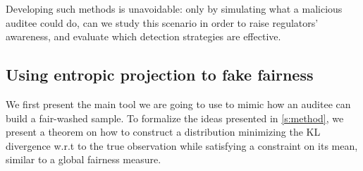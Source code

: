 \documentclass[runningheads, orivec]{llncs}
\begin{document}
Developing such methods is unavoidable: only by simulating what a malicious auditee could do, can we study this scenario in order to raise regulators’ awareness, and evaluate which detection strategies are effective.

\subsection{Using entropic projection to fake fairness} \label{sec:KL}
We first present the main tool we are going to use to mimic how an auditee can build a fair-washed sample. To formalize the ideas presented in \ref{s:method}, we present a theorem on how to construct a distribution minimizing the KL divergence w.r.t to the true observation while satisfying a constraint on its mean, similar to a global fairness measure.
\end{document}

